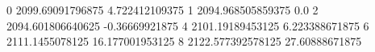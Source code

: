0 2099.69091796875 4.722412109375
1 2094.968505859375 0.0
2 2094.601806640625 -0.36669921875
4 2101.19189453125 6.223388671875
6 2111.1455078125 16.177001953125
8 2122.577392578125 27.60888671875
